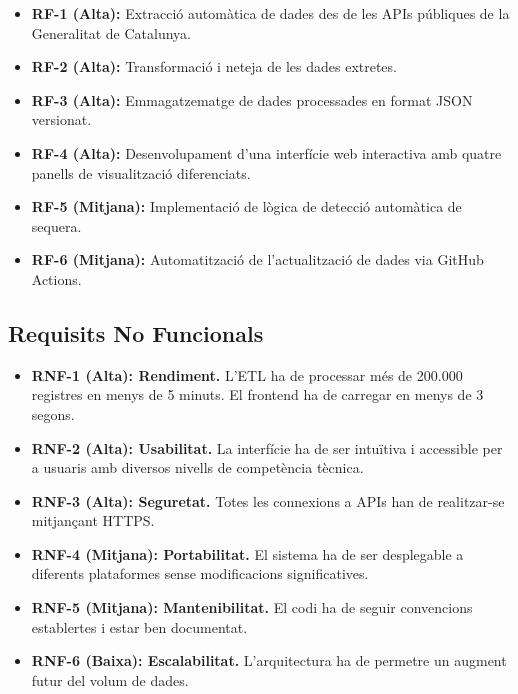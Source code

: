 \documentclass[11pt, a4paper]{article}
\begin{document}
\begin{itemize}[leftmargin=*]
    \item \textbf{RF-1 (Alta):} Extracció automàtica de dades des de les APIs públiques de la Generalitat de Catalunya.
    \item \textbf{RF-2 (Alta):} Transformació i neteja de les dades extretes.
    \item \textbf{RF-3 (Alta):} Emmagatzematge de dades processades en format JSON versionat.
    \item \textbf{RF-4 (Alta):} Desenvolupament d'una interfície web interactiva amb quatre panells de visualització diferenciats.
    \item \textbf{RF-5 (Mitjana):} Implementació de lògica de detecció automàtica de sequera.
    \item \textbf{RF-6 (Mitjana):} Automatització de l'actualització de dades via GitHub Actions.
\end{itemize}

\subsection{Requisits No Funcionals}

\begin{itemize}[leftmargin=*]
    \item \textbf{RNF-1 (Alta): Rendiment.} L'ETL ha de processar més de 200.000 registres en menys de 5 minuts. El frontend ha de carregar en menys de 3 segons.
    \item \textbf{RNF-2 (Alta): Usabilitat.} La interfície ha de ser intuïtiva i accessible per a usuaris amb diversos nivells de competència tècnica.
    \item \textbf{RNF-3 (Alta): Seguretat.} Totes les connexions a APIs han de realitzar-se mitjançant HTTPS.
    \item \textbf{RNF-4 (Mitjana): Portabilitat.} El sistema ha de ser desplegable a diferents plataformes sense modificacions significatives.
    \item \textbf{RNF-5 (Mitjana): Mantenibilitat.} El codi ha de seguir convencions establertes i estar ben documentat.
    \item \textbf{RNF-6 (Baixa): Escalabilitat.} L'arquitectura ha de permetre un augment futur del volum de dades.
\end{itemize}

\end{document}

